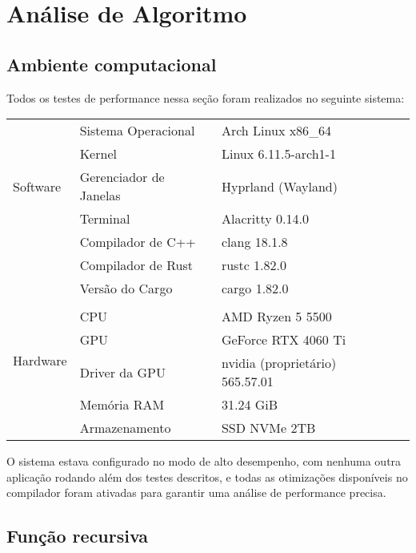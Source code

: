 \chapter{Análise de Algoritmo}
\label{ch:anal_de_alg} %

\section{Ambiente computacional}

Todos os testes de performance nessa seção foram realizados no seguinte sistema:

\begin{table}[!ht]
	\centering
	\begin{tabular}{llll}
		\toprule
		\multirow{5}{3cm}{Software}
		 & Sistema Operacional    & Arch Linux x86\_64              & \\
		 & Kernel                 & Linux 6.11.5-arch1-1            & \\
		 & Gerenciador de Janelas & Hyprland (Wayland)              & \\
		 & Terminal               & Alacritty 0.14.0                & \\
		 & Compilador de C++      & clang 18.1.8                    & \\
		 & Compilador de Rust     & rustc 1.82.0                    & \\
		 & Versão do Cargo        & cargo 1.82.0                    & \\
		 &                        &                                 & \\
		\multirow{4}{3cm}{Hardware}
		 & CPU                    & AMD Ryzen 5 5500                & \\
		 & GPU                    & GeForce RTX 4060 Ti             & \\
		 & Driver da GPU          & nvidia (proprietário) 565.57.01 & \\
		 & Memória RAM            & 31.24 GiB                       & \\
		 & Armazenamento          & SSD NVMe 2TB                    & \\
		\bottomrule
	\end{tabular}
\end{table}

\noindent
O sistema estava configurado no modo de alto desempenho, com nenhuma outra aplicação rodando além dos testes descritos, e todas as otimizações disponíveis no compilador foram ativadas para garantir uma análise de performance precisa.



\section{Função recursiva}





